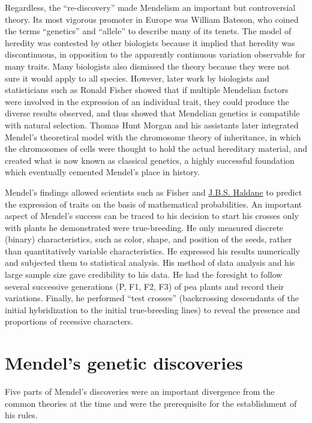 Regardless, the ``re-discovery'' made Mendelism an important but controversial theory. Its most vigorous promoter in Europe was William Bateson, who coined the terms ``genetics'' and ``allele'' to describe many of its tenets. The model of heredity was contested by other biologists because it implied that heredity was discontinuous, in opposition to the apparently continuous variation observable for many traits. Many biologists also dismissed the theory because they were not sure it would apply to all species. However, later work by biologists and statisticians such as Ronald Fisher showed that if multiple Mendelian factors were involved in the expression of an individual trait, they could produce the diverse results observed, and thus showed that Mendelian genetics is compatible with natural selection. Thomas Hunt Morgan and his assistants later integrated Mendel's theoretical model with the chromosome theory of inheritance, in which the chromosomes of cells were thought to hold the actual hereditary material, and created what is now known as classical genetics, a highly successful foundation which eventually cemented Mendel's place in history.

Mendel's findings allowed scientists such as Fisher and \href{https://en.wikipedia.org/wiki/J._B._S._Haldane}{J.B.S. Haldane} to predict the expression of traits on the basis of mathematical probabilities. An important aspect of Mendel's success can be traced to his decision to start his crosses only with plants he demonstrated were true-breeding. He only measured discrete (binary) characteristics, such as color, shape, and position of the seeds, rather than quantitatively variable characteristics. He expressed his results numerically and subjected them to statistical analysis. His method of data analysis and his large sample size gave credibility to his data. He had the foresight to follow several successive generations (P, F1, F2, F3) of pea plants and record their variations. Finally, he performed ``test crosses'' (backcrossing descendants of the initial hybridization to the initial true-breeding lines) to reveal the presence and proportions of recessive characters.

\hypertarget{mendels-genetic-discoveries}{%
\section{Mendel's genetic discoveries}\label{mendels-genetic-discoveries}}

Five parts of Mendel's discoveries were an important divergence from the common theories at the time and were the prerequisite for the establishment of his rules.

